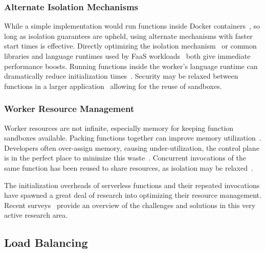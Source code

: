 \subsubsection{Alternate Isolation Mechanisms}
While a simple implementation would run functions inside Docker containers~\cite{docker-main}, so long as isolation guarantees are upheld, using alternate mechanisms with faster start times is effective.
Directly optimizing the isolation mechanism~\cite{firecracker-nsdi20} or common libraries and language runtimes used by FaaS workloads~\cite{carreira2021warm} both give immediate performance boosts. 
Running functions inside the worker's language runtime can dramatically reduce initialization times~\cite{vhive-asplos21,shillaker2020faasm,jia2021nightcore,du2020catalyzer}.
Security may be relaxed between functions in a larger application~\cite{akkus_sand_2018, dukic2020photons} allowing for the reuse of sandboxes.
%

\subsubsection{Worker Resource Management}
Worker resources are not infinite, especially memory for keeping function sandboxes available.
Packing functions together can improve memory utilization~\cite{akhtar_cose_2020}.
Developers often over-assign memory, causing under-utilization, the control plane is in the perfect place to minimize this waste~\cite{eismann2021sizeless, mvondo2021ofc}.
Concurrent invocations of the same function has been reused to share resources, as isolation may be relaxed~\cite{stojkovic2023mxfaas}.

The initialization overheads of serverless functions and their repeated invocations have spawned a great deal of research into optimizing their resource management.
Recent surveys~\cite{faas-survey-jan-2022, raza2021sok, eismann2020serverless, hassan2021survey, mampage2021holistic} provide an overview of the challenges and solutions in this very active research area. 

\subsection{Load Balancing}

